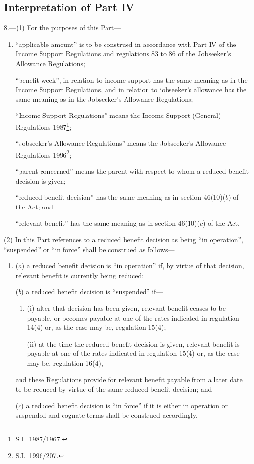 \documentclass[12pt,a4paper]{article}
\begin{document}
\renewcommand\parthead{--- Part IV}

\subsection[8. Interpretation of Part IV]{Interpretation of Part IV}

8.---(1)  For the purposes of this Part—
\begin{enumerate}\item[]
    “applicable amount” is to be construed in accordance with Part IV of the Income Support Regulations and regulations 83 to 86 of the Jobseeker’s Allowance Regulations;

    “benefit week”, in relation to income support has the same meaning as in the Income Support Regulations, and in relation to jobseeker’s allowance has the same meaning as in the Jobseeker’s Allowance Regulations;

    “Income Support Regulations” means the Income Support (General) Regulations 1987\footnote{S.I.\ 1987/1967.};

\begin{sloppypar}
    “Jobseeker’s Allowance Regulations” means the Jobseeker’s Allowance Regulations 1996\footnote{S.I.\ 1996/207.};
\end{sloppypar}

    “parent concerned” means the parent with respect to whom a reduced benefit decision is given;

    “reduced benefit decision” has the same meaning as in section 46(10)($b$)  of the Act; and

    “relevant benefit” has the same meaning as in section 46(10)($c$)  of the Act. 
\end{enumerate}

(2) In this Part references to a reduced benefit decision as being “in operation”, “suspended” or “in force” shall be construed as follows—
\begin{enumerate}\item[]
($a$) a reduced benefit decision is “in operation” if, by virtue of that decision, relevant benefit is currently being reduced;

($b$) a reduced benefit decision is “suspended” if—
\begin{enumerate}\item[]
(i) after that decision has been given, relevant benefit ceases to be payable, or becomes payable at one of the rates indicated in regulation 14(4) or, as the case may be, regulation 15(4);

(ii) at the time the reduced benefit decision is given, relevant benefit is payable at one of the rates indicated in regulation 15(4) or, as the case may be, regulation 16(4),
\end{enumerate}
and these Regulations provide for relevant benefit payable from a later date to be reduced by virtue of the same reduced benefit decision; and

($c$) a reduced benefit decision is “in force” if it is either in operation or suspended and cognate terms shall be construed accordingly.
\end{enumerate}
\end{document}
